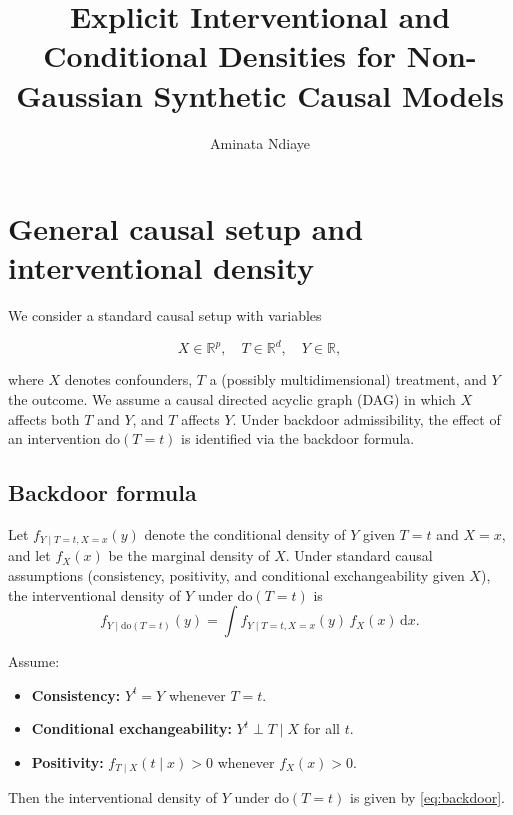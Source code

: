 \documentclass[11pt]{article}
\title{Explicit Interventional and Conditional Densities for Non-Gaussian Synthetic Causal Models}
\author{Aminata Ndiaye}
\date{}
\begin{document}
\maketitle

\section{General causal setup and interventional density}

We consider a standard causal setup with variables


\[
X \in \mathbb{R}^p,\quad T \in \mathbb{R}^d,\quad Y \in \mathbb{R},
\]


where $X$ denotes confounders, $T$ a (possibly multidimensional) treatment, and $Y$ the outcome.
We assume a causal directed acyclic graph (DAG) in which $X$ affects both $T$ and $Y$, and $T$ affects $Y$.
Under backdoor admissibility, the effect of an intervention $\mathrm{do}(T = t)$ is identified via the backdoor formula.

\subsection{Backdoor formula}

Let $f_{Y \mid T=t, X=x}(y)$ denote the conditional density of $Y$ given $T=t$ and $X=x$, and let $f_X(x)$ be the marginal density of $X$.
Under standard causal assumptions (consistency, positivity, and conditional exchangeability given $X$), the interventional density of $Y$ under $\mathrm{do}(T=t)$ is
\begin{equation}
    f_{Y \mid \mathrm{do}(T=t)}(y)
    = \int f_{Y \mid T=t, X=x}(y)\, f_X(x)\, \mathrm{d}x.
    \label{eq:backdoor}
\end{equation}

\begin{theorem}
Assume:
\begin{itemize}
    \item[(i)] \textbf{Consistency:} $Y^{t} = Y$ whenever $T=t$.
    \item[(ii)] \textbf{Conditional exchangeability:} $Y^{t} \perp T \mid X$ for all $t$.
    \item[(iii)] \textbf{Positivity:} $f_{T \mid X}(t \mid x) > 0$ whenever $f_X(x) > 0$.
\end{itemize}
Then the interventional density of $Y$ under $\mathrm{do}(T=t)$ is given by \eqref{eq:backdoor}.
\end{theorem}
\end{document}
